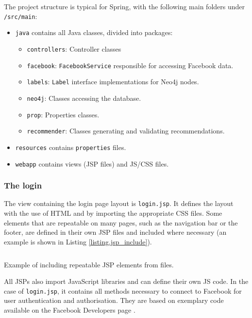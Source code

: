 \documentclass[12pt]{report}
\begin{document}
The project structure is typical for Spring, with the following main folders under \texttt{/src/main}:
\begin{itemize}
\item \texttt{java} contains all Java classes, divided into packages:
    \begin{itemize}
    \item \texttt{controllers}: Controller classes
    \item \texttt{facebook}: \texttt{FacebookService} responsible for accessing Facebook data.
    \item \texttt{labels}: \texttt{Label} interface implementations for Neo4j nodes.
    \item \texttt{neo4j}: Classes accessing the database.
    \item \texttt{prop}: Properties classes.
    \item \texttt{recommender}: Classes generating and validating recommendations.
    \end{itemize}
\item \texttt{resources} contains \texttt{properties} files.
\item \texttt{webapp} contains views (JSP files) and JS/CSS files.
\end{itemize}


\subsubsection{The login}

The view containing the login page layout is \texttt{login.jsp}. It defines the layout with the use of HTML and by importing the appropriate CSS files. Some elements that are repeatable on many pages, such as the navigation bar or the footer, are defined in their own JSP files and included where necessary (an example is shown in Listing \ref{listing.jsp_include}).

\begin{listing}
\inputminted[frame=lines,framesep=3mm]{jsp}{code_jsp_include.jsp}
\caption{Example of including repeatable JSP elements from files.}
\label{listing.jsp_include}
\end{listing}

All JSPs also import JavaScript libraries and can define their own JS code. In the case of \texttt{login.jsp}, it contains all methods necessary to connect to Facebook for user authentication and authorisation. They are based on exemplary code available on the Facebook Developers page \cite{facebook_login_web}.
\end{document}
